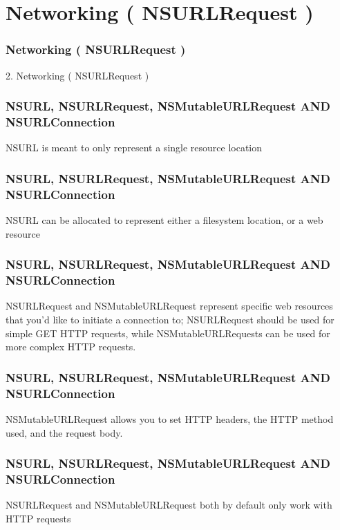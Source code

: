 \documentclass[10pt]{beamer}
\begin{document}
    

   
  

  
    
\section{Networking ( NSURLRequest )}
\begin{frame}[fragile]
  \frametitle{Networking ( NSURLRequest )}
  2. Networking ( NSURLRequest )
\end{frame}


    
\begin{frame}[fragile]
  \frametitle{NSURL, NSURLRequest,  NSMutableURLRequest AND NSURLConnection}
  NSURL is meant to only represent a single resource location

\end{frame}

\begin{frame}[fragile]
  \frametitle{NSURL, NSURLRequest,  NSMutableURLRequest AND NSURLConnection}
  NSURL can be allocated to represent either a filesystem location, or a web resource

\end{frame}

\begin{frame}[fragile]
  \frametitle{NSURL, NSURLRequest,  NSMutableURLRequest AND NSURLConnection}
  NSURLRequest and NSMutableURLRequest represent specific web resources that you'd like to initiate a connection to; NSURLRequest should be used for simple GET HTTP requests, while NSMutableURLRequests can be used for more complex HTTP requests.

\end{frame}

\begin{frame}[fragile]
  \frametitle{NSURL, NSURLRequest,  NSMutableURLRequest AND NSURLConnection}
  NSMutableURLRequest allows you to set HTTP headers, the HTTP method used, and the request body.

\end{frame}

\begin{frame}[fragile]
  \frametitle{NSURL, NSURLRequest,  NSMutableURLRequest AND NSURLConnection}
  NSURLRequest and NSMutableURLRequest both by default only work with HTTP requests

\end{frame}
\end{document}
